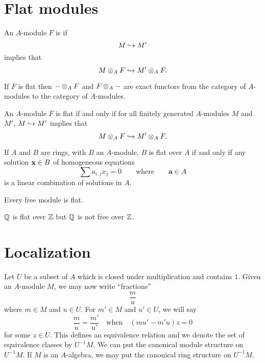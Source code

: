 \documentclass{ximera}
\begin{document}
\section{Flat modules}

\begin{definition} An $A$-module $F$ is  if 
\[
M\hookrightarrow M'
\]
implies that
\[
M\otimes_A F \hookrightarrow M'\otimes_A F.
\]
\end{definition}

\begin{remark} If $F$ is flat then $-\otimes_A F$ and $F\otimes_A -$ are exact functors from the category of $A$-modules to the category of $A$-modules.
\end{remark}

\begin{proposition} An $A$-module $F$ is flat if and only if for all finitely generated $A$-modules $M$ and $M'$, $M\hookrightarrow M'$ implies that 
\[
M\otimes_A F \hookrightarrow M'\otimes_A F.
\]
\end{proposition}

\begin{proposition}
  If $A$ and $B$ are rings, with $B$ an $A$-module, $B$ is flat over
  $A$ if and only if any solution $\mathbf{x}\in B$ of homogeneous equations
  \[
  \sum a_{i,j} x_j =0 \qquad\text{where}\qquad \mathbf{a}\in A
  \]
  is a linear combination of solutions in $A$.
\end{proposition}


\begin{proposition} Every free module is flat.
\end{proposition}

\begin{example} $\mathbb Q$ is flat over $\mathbb Z$ but $\mathbb Q$ is not free over $\mathbb Z$.
\end{example}





\section{Localization}

Let $U$ be a subset of $A$ which is closed under multiplication and contains $1$. Given an $A$-module $M$, we may now write ``fractions'' 
\[
\frac{m}{u}
\]
where $m\in M$ and $u\in U$. For $m'\in M$ and $u'\in U$, we will say
\[
\frac{m}{u} = \frac{m'}{u'}\quad\text{when}\quad (mu' -m'u)z = 0 
\]
for some $z\in U$. This defines an equivalence relation and we denote the set of equivalence classes by $U^{-1} M$. We can put the canonical module structure on $U^{-1}M$. If $M$ is an $A$-algebra, we may put the canonical ring structure on $U^{-1}M$.
\end{document}
